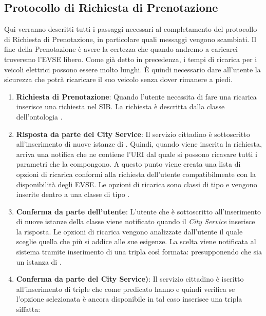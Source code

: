 \subsection{Protocollo di Richiesta di Prenotazione}

Qui verranno descritti tutti i passaggi necessari al completamento del protocollo di Richiesta di Prenotazione, in particolare quali messaggi vengono scambiati. Il fine della Prenotazione è avere la certezza che quando andremo a caricarci troveremo l'EVSE libero. Come già detto in precedenza, i tempi di ricarica per i veicoli elettrici possono essere molto lunghi. È quindi necessario dare all'utente la sicurezza che potrà ricaricare il suo veicolo senza dover rimanere a piedi.

\begin{enumerate}[label=\textbf{\arabic*}]
	\item \textbf{Richiesta di Prenotazione}: Quando l'utente necessita di fare una ricarica inserisce una richiesta nel SIB. La richiesta è descritta dalla classe dell'ontologia .
	\item \textbf{Risposta da parte del City Service}: Il servizio cittadino è sottoscritto all'inserimento di nuove istanze di . Quindi, quando viene inserita la richiesta, arriva una notifica che ne contiene l'URI dal quale si possono ricavare tutti i parametri che la compongono. A questo punto viene creata una lista di opzioni di ricarica conformi alla richiesta dell'utente compatibilmente con la disponibilità degli EVSE. Le opzioni di ricarica sono classi di tipo  e vengono inserite dentro a una classe di tipo .
	\item \label{item:confirmByUser} \textbf{Conferma da parte dell'utente}: L'utente che è sottoscritto all'inserimento di nuove istanze della classe   viene notificato quando il \emph{City Service} inserisce la risposta. Le opzioni di ricarica vengono analizzate dall'utente il quale sceglie quella che più si addice alle sue esigenze. La scelta viene notificata al sistema tramite inserimento di una tripla così formata:  presupponendo che  sia un istanza di .
	\item \textbf{Conferma da parte del City Service)}: Il servizio cittadino è iscritto all'inserimento di triple che come predicato hanno  e quindi verifica se l'opzione selezionata è ancora disponibile in tal caso inserisce una tripla siffatta:

\end{enumerate}
